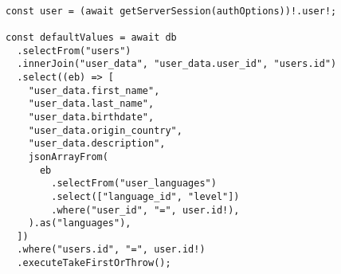 \begin{verbatim}

const user = (await getServerSession(authOptions))!.user!;

const defaultValues = await db
  .selectFrom("users")
  .innerJoin("user_data", "user_data.user_id", "users.id")
  .select((eb) => [
    "user_data.first_name",
    "user_data.last_name",
    "user_data.birthdate",
    "user_data.origin_country",
    "user_data.description",
    jsonArrayFrom(
      eb
        .selectFrom("user_languages")
        .select(["language_id", "level"])
        .where("user_id", "=", user.id!),
    ).as("languages"),
  ])
  .where("users.id", "=", user.id!)
  .executeTakeFirstOrThrow();
\end{verbatim}
